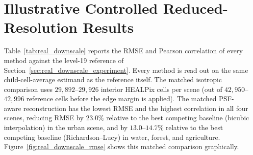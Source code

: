 \documentclass[journal]{IEEEtran}
\newcommand{\healpix}{HEALPix\xspace}
\newcommand{\psf}{PSF\xspace}
\begin{document}
\section{Illustrative Controlled Reduced-Resolution Results}
\label{supp:real_downscale_results}

Table~\ref{tab:real_downscale} reports the RMSE and Pearson
correlation of every method against the level-19 reference of
Section~\ref{sec:real_downscale_experiment}. Every method is read out
on the same child-cell-average estimand as the reference itself. The
matched isotropic comparison uses $29{,}892$--$29{,}926$ interior
\healpix cells per scene (out of $42{,}950$--$42{,}996$ reference
cells before the edge margin is applied). The matched \psf-aware
reconstruction has the lowest RMSE and the highest correlation in all
four scenes, reducing RMSE by $23.0\%$ relative to the best competing
baseline (bicubic interpolation) in the urban scene, and by
$13.0$--$14.7\%$ relative to the best competing baseline
(Richardson--Lucy) in water, forest, and agriculture.
Figure~\ref{fig:real_downscale_rmse} shows this matched comparison
graphically.
\end{document}
